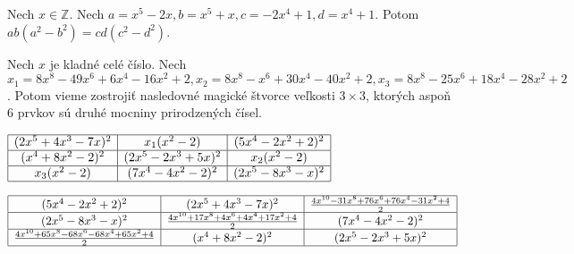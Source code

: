 \begin{lemma}
\label{square3x3x}
Nech $x \in \mathbb{Z}$. Nech $a = x^5 - 2x, b = x^5 + x, c = -2x^4 + 1, d = x^4 + 1$. Potom $ab(a^2 - b^2) = cd(c^2 - d^2)$.
\end{lemma}

\begin{theorem}
\label{3x3square6squares}
Nech $x$ je kladné celé číslo. Nech $x_1 = 8x^8 - 49x^6 + 6x^4 - 16x^2 + 2, x_2 = 8x^8 - x^6 + 30x^4 - 40x^2 + 2, x_3 = 8x^8 - 25x^6 + 18x^4 - 28x^2 + 2$. Potom vieme zostrojiť nasledovné magické štvorce veľkosti $3 \times 3$, ktorých aspoň $6$ prvkov sú druhé mocniny prirodzených čísel.
\end{theorem}

\begin{center}
$\begin{array}{ |c|c|c| } 
\hline
(2x^5 + 4x^3 - 7x)^2 & x_1(x^2 - 2) & (5x^4 - 2x^2 + 2)^2 \\ 
\hline
(x^4 + 8x^2 - 2)^2 & (2x^5 - 2x^3 + 5x)^2 & x_2(x^2 - 2) \\ 
\hline
x_3(x^2 - 2) & (7x^4 - 4x^2 - 2)^2 & (2x^5 - 8x^3 - x)^2 \\
\hline
\end{array}$

$\begin{array}{ |c|c|c| } 
\hline
(5x^4 - 2x^2 + 2)^2 & (2x^5 + 4x^3 - 7x)^2 & \frac{4x^{10} - 31x^8 + 76x^6 + 76x^4 - 31x^2 + 4}{2}\\ 
\hline
(2x^5 - 8x^3 - x)^2 & \frac{4x^{10} + 17x^8 + 4x^6 + 4x^4 + 17x^2 + 4}{2} & (7x^4 - 4x^2 - 2)^2 \\ 
\hline
\frac{4x^{10} + 65x^8 - 68x^6 - 68x^4 + 65x^2 + 4}{2} & (x^4 + 8x^2 - 2)^2 & (2x^5 - 2x^3 + 5x)^2 \\
\hline
\end{array}$
\end{center}

